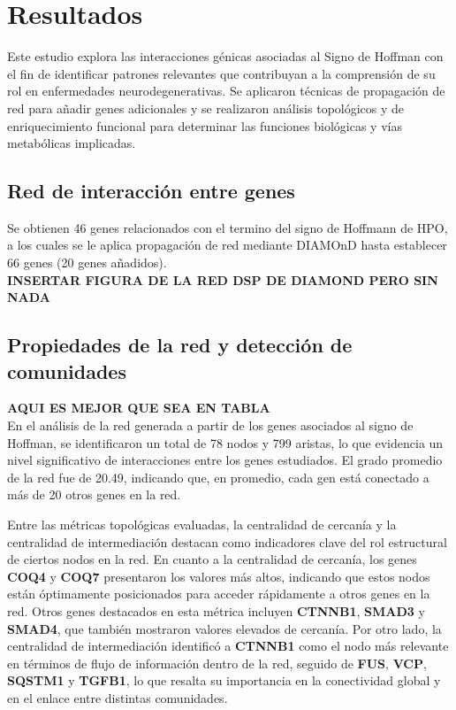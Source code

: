 \section{Resultados}

Este estudio explora las interacciones génicas asociadas al Signo de Hoffman con el fin de identificar patrones relevantes que contribuyan a la comprensión de su rol en enfermedades neurodegenerativas. Se aplicaron técnicas de propagación de red para añadir genes adicionales y se realizaron análisis topológicos y de enriquecimiento funcional para determinar las funciones biológicas y vías metabólicas implicadas.

\subsection{Red de interacción entre genes}


Se obtienen 46 genes relacionados con el termino del signo de Hoffmann de HPO, a los cuales se le aplica propagación de red mediante DIAMOnD hasta establecer 66 genes (20 genes añadidos).
\\

\textbf{INSERTAR FIGURA DE LA RED DSP DE DIAMOND PERO SIN NADA}\\

\subsection{Propiedades de la red y detección de comunidades}


\textbf{AQUI ES MEJOR QUE SEA EN TABLA}
\\

En el análisis de la red generada a partir de los genes asociados al signo de Hoffman, se identificaron un total de 78 nodos y 799 aristas, lo que evidencia un nivel significativo de interacciones entre los genes estudiados. El grado promedio de la red fue de 20.49, indicando que, en promedio, cada gen está conectado a más de 20 otros genes en la red.

Entre las métricas topológicas evaluadas, la centralidad de cercanía y la centralidad de intermediación destacan como indicadores clave del rol estructural de ciertos nodos en la red. En cuanto a la centralidad de cercanía, los genes \textbf{COQ4} y \textbf{COQ7} presentaron los valores más altos, indicando que estos nodos están óptimamente posicionados para acceder rápidamente a otros genes en la red. Otros genes destacados en esta métrica incluyen \textbf{CTNNB1}, \textbf{SMAD3} y \textbf{SMAD4}, que también mostraron valores elevados de cercanía. Por otro lado, la centralidad de intermediación identificó a \textbf{CTNNB1} como el nodo más relevante en términos de flujo de información dentro de la red, seguido de \textbf{FUS}, \textbf{VCP}, \textbf{SQSTM1} y \textbf{TGFB1}, lo que resalta su importancia en la conectividad global y en el enlace entre distintas comunidades.

